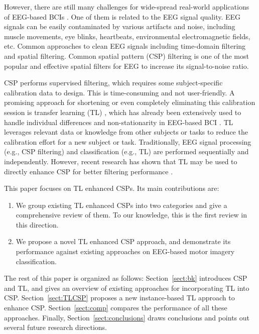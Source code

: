 \documentclass[runningheads]{llncs}
\begin{document}
However, there are still many challenges for wide-spread real-world applications of EEG-based BCIs \cite{Makeig2012,Lance2012}. One of them is related to the EEG signal quality. EEG signals can be easily contaminated by various artifacts and noise, including muscle movements, eye blinks, heartbeats, environmental electromagnetic fields, etc. Common approaches to clean EEG signals including time-domain filtering and spatial filtering. Common spatial pattern (CSP) filtering \cite{drwuSF2018,Blankertz2008,Ramoser2000,drwuRG2017} is one of the most popular and effective spatial filters for EEG to increase its signal-to-noise ratio.

CSP performs supervised filtering, which requires some subject-specific calibration data to design. This is time-consuming and not user-friendly. A promising approach for shortening or even completely eliminating this calibration session is transfer learning (TL) \cite{Pan2010}, which has already been extensively used to handle individual differences and non-stationarity in EEG-based BCI \cite{Jayaram2016,Waytowich2016,drwuTHMS2017,drwuTFS2016,drwuTNSRE2016,drwuSMC2015,drwuSMC2014}. TL leverages relevant data or knowledge from other subjects or tasks to reduce the calibration effort for a new subject or task. Traditionally, EEG signal processing (e.g., CSP filtering) and classification (e.g., TL) are performed sequentially and independently. However, recent research has shown that TL may be used to directly enhance CSP for better filtering performance \cite{Kang2009,Dalhoumi2014,Lotte2010}.

This paper focuses on TL enhanced CSPs. Its main contributions are:
\begin{enumerate}
\item We group existing TL enhanced CSPs into two categories and give a comprehensive review of them. To our knowledge, this is the first review in this direction.
\item We propose a novel TL enhanced CSP approach, and demonstrate its performance against existing approaches on EEG-based motor imagery classification.
\end{enumerate}

The rest of this paper is organized as follows: Section~\ref{sect:bk} introduces CSP and TL, and gives an overview of existing approaches for incorporating TL into CSP. Section~\ref{sect:TLCSP} proposes a new instance-based TL approach to enhance CSP. Section~\ref{sect:comp} compares the performance of all these approaches. Finally, Section~\ref{sect:conclusions} draws conclusions and points out several future research directions.
\end{document}
